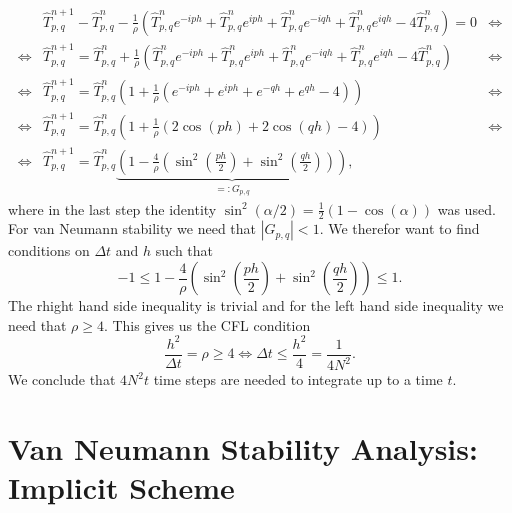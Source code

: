 \documentclass[a4aper,pagesize]{scrartcl}
\theoremstyle{definition}
\theoremstyle{plain}
\theoremstyle{remark}
\renewcommand{\hat}{\widehat}
\begin{document}
\begin{align*}
	  &\hat{T}^{n+1}_{p,q}
	- \hat{T}^{n}_{p,q}
	-\frac{1}{\rho} \left(
		  \hat{T}^{n}_{p,q} e^{-iph}
		+ \hat{T}^{n}_{p,q} e^{iph}
	    + \hat{T}^{n}_{p,q} e^{-iqh}
		+ \hat{T}^{n}_{p,q} e^{iqh}
		-  4 \hat{T}^{n}_{p,q}
	\right)= 0
&\Leftrightarrow\\
\Leftrightarrow
	  &\hat{T}^{n+1}_{p,q} =
      \hat{T}^{n}_{p,q}
	 +\frac{1}{\rho} \left(
		  \hat{T}^{n}_{p,q} e^{-iph}
		+ \hat{T}^{n}_{p,q} e^{iph}
	    + \hat{T}^{n}_{p,q} e^{-iqh}
		+ \hat{T}^{n}_{p,q} e^{iqh}
		-  4 \hat{T}^{n}_{p,q}
	\right)
&\Leftrightarrow\\
\Leftrightarrow
	  &\hat{T}^{n+1}_{p,q} =
      \hat{T}^{n}_{p,q}\left(
      1
	 +\frac{1}{\rho} \left(
		  e^{-iph}
		+ e^{iph}
	    + e^{-qh}
		+ e^{qh}
		-  4
	    \right)
	\right)
&\Leftrightarrow\\
\Leftrightarrow
	  &\hat{T}^{n+1}_{p,q} =
      \hat{T}^{n}_{p,q}\left(
      1
	 +\frac{1}{\rho} \left(
		  2\cos(ph)
	    + 2\cos(qh)
	    - 4
	    \right)
	\right)
&\Leftrightarrow\\
\Leftrightarrow
	  &\hat{T}^{n+1}_{p,q} =
      \hat{T}^{n}_{p,q}\underbrace{\left(
      1
	 -\frac{4}{\rho} \left(
	      \sin^2\left(\frac{ph}{2}\right)
	    + \sin^2\left(\frac{qh}{2}\right)
	    \right)
	  \right)}_{=:G_{p,q}},
\end{align*}
where in the last step the identity $\sin^2(\alpha/2) = \frac{1}{2}(1-\cos(\alpha))$ was used. For van Neumann stability we need that $|G_{p,q}|<1$. We therefor want to find conditions on $\Delta t$ and $h$ such that
\begin{equation}
-1 \le
	1-\frac{4}{\rho} \left(
		  \sin^2\left(\frac{ph}{2}\right)
	    + \sin^2\left(\frac{qh}{2}\right)
	\right)
	\le 1.
\end{equation}
The rhight hand side inequality is trivial and for the left hand side inequality we need that $\rho \geq 4$. This gives us the CFL condition
\begin{equation}
	\frac{h^2}{\Delta t} = \rho \geq 4 \Leftrightarrow \Delta t \leq \frac{h^2}{4} = \frac{1}{4N^2}.
\end{equation}
We conclude that $4N^2t$ time steps are needed to integrate up to a time $t$.


\section{Van Neumann Stability Analysis: Implicit Scheme}
\end{document}
